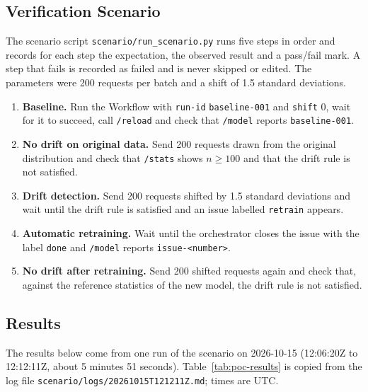\subsection{Verification Scenario}

The scenario script \texttt{scenario/run\_scenario.py} runs five steps in order and records for each step the expectation, the observed result and a pass/fail mark. A step that fails is recorded as failed and is never skipped or edited. The parameters were 200 requests per batch and a shift of 1.5 standard deviations.

\begin{enumerate}
  \item \textbf{Baseline.} Run the Workflow with \texttt{run-id} \texttt{baseline-001} and \texttt{shift} 0, wait for it to succeed, call \texttt{/reload} and check that \texttt{/model} reports \texttt{baseline-001}.
  \item \textbf{No drift on original data.} Send 200 requests drawn from the original distribution and check that \texttt{/stats} shows $n \ge 100$ and that the drift rule is not satisfied.
  \item \textbf{Drift detection.} Send 200 requests shifted by 1.5 standard deviations and wait until the drift rule is satisfied and an issue labelled \texttt{retrain} appears.
  \item \textbf{Automatic retraining.} Wait until the orchestrator closes the issue with the label \texttt{done} and \texttt{/model} reports \texttt{issue-<number>}.
  \item \textbf{No drift after retraining.} Send 200 shifted requests again and check that, against the reference statistics of the new model, the drift rule is not satisfied.
\end{enumerate}

\subsection{Results}

The results below come from one run of the scenario on 2026-10-15 (12:06:20Z to 12:12:11Z, about 5 minutes 51 seconds). Table~\ref{tab:poc-results} is copied from the log file \texttt{scenario/logs/20261015T121211Z.md}; times are UTC.


